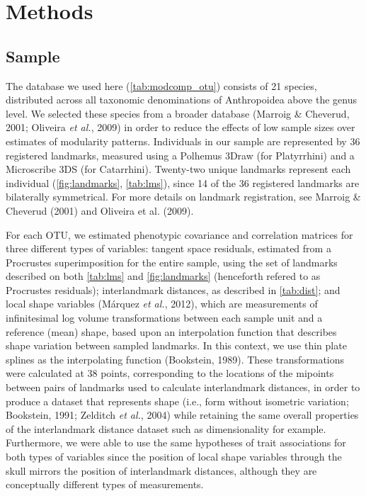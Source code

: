 \documentclass[12pt,]{article}
\begin{document}
\section{Methods}\label{methods}

\subsection{Sample}\label{sample}

The database we used here (\autoref{tab:modcomp_otu}) consists of 21
species, distributed across all taxonomic denominations of Anthropoidea
above the genus level. We selected these species from a broader database
(Marroig \& Cheverud, 2001; Oliveira \emph{et al.}, 2009) in order to
reduce the effects of low sample sizes over estimates of modularity
patterns. Individuals in our sample are represented by 36 registered
landmarks, measured using a Polhemus 3Draw (for Platyrrhini) and a
Microscribe 3DS (for Catarrhini). Twenty-two unique landmarks represent
each individual (\autoref{fig:landmarks}, \autoref{tab:lms}), since 14
of the 36 registered landmarks are bilaterally symmetrical. For more
details on landmark registration, see Marroig \& Cheverud (2001) and
Oliveira et al. (2009).



For each OTU, we estimated phenotypic covariance and correlation
matrices for three different types of variables: tangent space
residuals, estimated from a Procrustes superimposition for the entire
sample, using the set of landmarks described on both \autoref{tab:lms}
and \autoref{fig:landmarks} (henceforth refered to as Procrustes
residuals); interlandmark distances, as described in \autoref{tab:dist};
and local shape variables (Márquez \emph{et al.}, 2012), which are
measurements of infinitesimal log volume transformations between each
sample unit and a reference (mean) shape, based upon an interpolation
function that describes shape variation between sampled landmarks. In
this context, we use thin plate splines as the interpolating function
(Bookstein, 1989). These transformations were calculated at 38 points,
corresponding to the locations of the mipoints between pairs of
landmarks used to calculate interlandmark distances, in order to produce
a dataset that represents shape (i.e., form without isometric variation;
Bookstein, 1991; Zelditch \emph{et al.}, 2004) while retaining the same
overall properties of the interlandmark distance dataset such as
dimensionality for example. Furthermore, we were able to use the same
hypotheses of trait associations for both types of variables since the
position of local shape variables through the skull mirrors the position
of interlandmark distances, although they are conceptually different
types of measurements.
\end{document}
